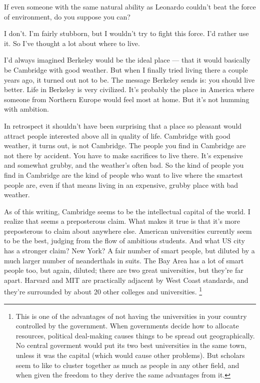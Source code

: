 If even someone with the same natural ability as Leonardo couldn't beat
the force of environment, do you suppose you can?

I don't. I'm fairly stubborn, but I wouldn't try to fight this force.
I'd rather use it. So I've thought a lot about where to live.

I'd always imagined Berkeley would be the ideal place --- that it would
basically be Cambridge with good weather. But when I finally tried
living there a couple years ago, it turned out not to be. The message
Berkeley sends is: you should live better. Life in Berkeley is very
civilized. It's probably the place in America where someone from
Northern Europe would feel most at home. But it's not humming with
ambition.

In retrospect it shouldn't have been surprising that a place so pleasant
would attract people interested above all in quality of life. Cambridge
with good weather, it turns out, is not Cambridge. The people you find
in Cambridge are not there by accident. You have to make sacrifices to
live there. It's expensive and somewhat grubby, and the weather's often
bad. So the kind of people you find in Cambridge are the kind of people
who want to live where the smartest people are, even if that means
living in an expensive, grubby place with bad weather.

As of this writing, Cambridge seems to be the intellectual capital of
the world. I realize that seems a preposterous claim. What makes it true
is that it's more preposterous to claim about anywhere else. American
universities currently seem to be the best, judging from the flow of
ambitious students. And what US city has a stronger claim? New York? A
fair number of smart people, but diluted by a much larger number of
neanderthals in suits. The Bay Area has a lot of smart people too, but
again, diluted; there are two great universities, but they're far apart.
Harvard and MIT are practically adjacent by West Coast standards, and
they're surrounded by about 20 other colleges and universities.
\footnote{This is one of the advantages of not having the universities in
your country controlled by the government. When governments decide how
to allocate resources, political deal-making causes things to be spread
out geographically. No central goverment would put its two best
universities in the same town, unless it was the capital (which would
cause other problems). But scholars seem to like to cluster together as
much as people in any other field, and when given the freedom to they
derive the same advantages from it.}


